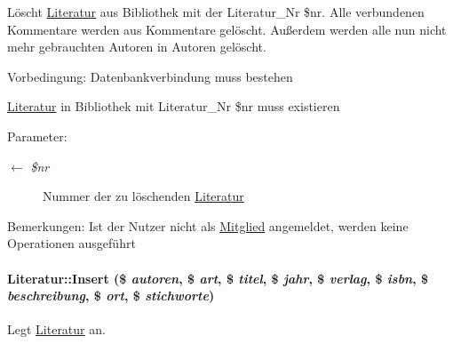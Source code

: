 Löscht \hyperlink{classLiteratur}{Literatur} aus Bibliothek mit der Literatur\_\-Nr \$nr. Alle verbundenen Kommentare werden aus Kommentare gelöscht. Außerdem werden alle nun nicht mehr gebrauchten Autoren in Autoren gelöscht. \begin{Desc}
\item[Vorbedingung:]Datenbankverbindung muss bestehen 

\hyperlink{classLiteratur}{Literatur} in Bibliothek mit Literatur\_\-Nr \$nr muss existieren \end{Desc}
\begin{Desc}
\item[Parameter:]
\begin{description}
\item[\mbox{$\leftarrow$} {\em \$nr}]Nummer der zu löschenden \hyperlink{classLiteratur}{Literatur} \end{description}
\end{Desc}
\begin{Desc}
\item[Bemerkungen:]Ist der Nutzer nicht als \hyperlink{classMitglied}{Mitglied} angemeldet, werden keine Operationen ausgeführt \end{Desc}
\hypertarget{classLiteratur_3347551316e8f73659fc6f32ac6095df}{
\paragraph[Insert]{\setlength{\rightskip}{0pt plus 5cm}Literatur::Insert (\$ {\em autoren}, \$ {\em art}, \$ {\em titel}, \$ {\em jahr}, \$ {\em verlag}, \$ {\em isbn}, \$ {\em beschreibung}, \$ {\em ort}, \$ {\em stichworte})}\hfill}
\label{classLiteratur_3347551316e8f73659fc6f32ac6095df}


Legt \hyperlink{classLiteratur}{Literatur} an. 


